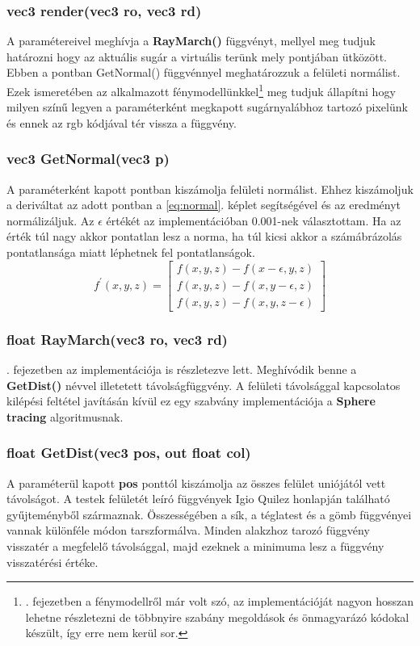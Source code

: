 \subsubsection{vec3 render(vec3 ro, vec3 rd)}
A paramétereivel meghívja a \textbf{RayMarch()} függvényt, mellyel meg tudjuk határozni hogy az aktuális sugár a virtuális terünk mely pontjában ütközött. Ebben a pontban GetNormal() függvénnyel meghatározzuk a felületi normálist. Ezek ismeretében az alkalmazott fénymodellünkkel\footnote{. fejezetben a fénymodellről már volt szó, az implementációját nagyon hosszan lehetne részletezni de többnyire szabány megoldások és önmagyarázó kódokal készült, így erre nem kerül sor.} meg tudjuk állapítni hogy milyen színű legyen a paraméterként megkapott sugárnyalábhoz tartozó pixelünk és ennek az rgb kódjával tér vissza a függvény. 

\subsubsection{vec3 GetNormal(vec3 p)}
A paraméterként kapott pontban kiszámolja felületi normálist. Ehhez kiszámoljuk a deriváltat az adott pontban a \ref{eq:normal}. képlet segítségével és az eredményt normálizáljuk. Az \textbf{$\epsilon$} értékét az implementációban 0.001-nek választottam. Ha az érték túl nagy akkor pontatlan lesz a norma, ha túl kicsi akkor a számábrázolás pontatlansága miatt léphetnek fel pontatlanságok.
\begin{equation}
\label{eq:normal}
f^{\prime}(x, y, z)=\left[\begin{array}{l}
f(x, y, z)-f(x-\epsilon, y, z) \\
f(x, y, z)-f(x, y-\epsilon, z) \\
f(x, y, z)-f(x, y, z-\epsilon)
\end{array}\right]
\end{equation}


\subsubsection{float RayMarch(vec3 ro, vec3 rd)}
. fejezetben az implementációja is részletezve lett. Meghívódik benne a \textbf{GetDist()} névvel illetetett távolságfüggvény. A felületi távolsággal kapcsolatos kilépési feltétel javításán kívül ez egy szabvány implementációja a \textbf{Sphere tracing} algoritmusnak.

\subsubsection{float GetDist(vec3 pos, out float col)}
A paraméterül kapott \textbf{pos} ponttól kiszámolja az összes felület uniójától vett távolságot. A testek felületét leíró függvények Igio Quilez honlapján \cite{InigoQui87:online} található gyűjteményből származnak. Összességében a sík, a téglatest és a gömb függvényei vannak különféle módon tarszformálva. Minden alakzhoz tarozó függvény visszatér a megfelelő távolsággal, majd ezeknek a minimuma lesz a függvény visszatérési értéke. 

